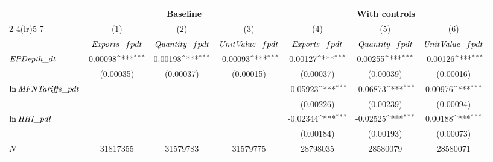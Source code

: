 {
\def\sym#1{\ifmmode^{#1}\else\(^{#1}\)\fi}
\begin{tabular}{l*{6}{c}}
\toprule
                              &\multicolumn{3}{c}{Baseline}                            &\multicolumn{3}{c}{With controls}                       \\\cmidrule(lr){2-4}\cmidrule(lr){5-7}
                              &\multicolumn{1}{c}{(1)}&\multicolumn{1}{c}{(2)}&\multicolumn{1}{c}{(3)}&\multicolumn{1}{c}{(4)}&\multicolumn{1}{c}{(5)}&\multicolumn{1}{c}{(6)}\\
                              &\multicolumn{1}{c}{$\textit{Exports}\\\_{fpdt}$}&\multicolumn{1}{c}{$\textit{Quantity}\\\_{fpdt}$}&\multicolumn{1}{c}{$\textit{UnitValue}\\\_{fpdt}$}&\multicolumn{1}{c}{$\textit{Exports}\\\_{fpdt}$}&\multicolumn{1}{c}{$\textit{Quantity}\\\_{fpdt}$}&\multicolumn{1}{c}{$\textit{UnitValue}\\\_{fpdt}$}\\
\midrule
$\textit{EPDepth}\\\_{dt}$     &  0.00098\sym{***}&  0.00198\sym{***}& -0.00093\sym{***}&  0.00127\sym{***}&  0.00255\sym{***}& -0.00126\sym{***}\\
                              &(0.00035)         &(0.00037)         &(0.00015)         &(0.00037)         &(0.00039)         &(0.00016)         \\
$\ln \textit{MFNTariffs}\\\_{pdt}$&                  &                  &                  & -0.05923\sym{***}& -0.06873\sym{***}&  0.00976\sym{***}\\
                              &                  &                  &                  &(0.00226)         &(0.00239)         &(0.00094)         \\
$\ln \textit{HHI}\\\_{pdt}$    &                  &                  &                  & -0.02344\sym{***}& -0.02525\sym{***}&  0.00188\sym{***}\\
                              &                  &                  &                  &(0.00184)         &(0.00193)         &(0.00073)         \\
\midrule
\(N\)                         & 31817355         & 31579783         & 31579775         & 28798035         & 28580079         & 28580071         \\

\end{tabular}}
